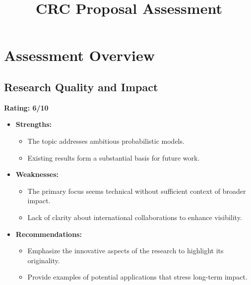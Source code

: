 \documentclass{article}
\title{CRC Proposal Assessment}
\author{}
\date{}
\begin{document}
\maketitle

\section{Assessment Overview}

\subsection{Research Quality and Impact}
\textbf{Rating: 6/10}
\begin{itemize}
    \item \textbf{Strengths:}
        \begin{itemize}
            \item The topic addresses ambitious probabilistic models.
            \item Existing results form a substantial basis for future work.
        \end{itemize}
    \item \textbf{Weaknesses:}
        \begin{itemize}
            \item The primary focus seems technical without sufficient context of broader impact.
            \item Lack of clarity about international collaborations to enhance visibility.
        \end{itemize}
    \item \textbf{Recommendations:}
        \begin{itemize}
            \item Emphasize the innovative aspects of the research to highlight its originality.
            \item Provide examples of potential applications that stress long-term impact.
        \end{itemize}
\end{itemize}
\end{document}

